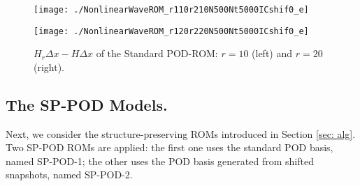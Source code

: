 \documentclass[11pt]{article}
\begin{document}
\begin{figure}[htb]
\centering
\begin{minipage}[ht]{0.45\linewidth}
\texttt{[image: ./NonlinearWaveROM\_r110r210N500Nt5000ICshif0\_e]}
\end{minipage}
\hspace{.2cm}
\begin{minipage}[ht]{0.45\linewidth}
\texttt{[image: ./NonlinearWaveROM\_r120r220N500Nt5000ICshif0\_e]}
\end{minipage}
\caption{
$H_r\Delta x-H\Delta x$ of the Standard POD-ROM: $r=10$ (left) and $r=20$ (right). 
}\label{Fig: podg}
\end{figure}


\subsection{The SP-POD Models.} 
Next, we consider the structure-preserving ROMs introduced in Section \ref{sec: alg}. Two SP-POD ROMs are applied: the first one uses the standard POD basis, named SP-POD-1; the other uses the POD basis generated from shifted snapshots, named SP-POD-2. 
\end{document}
